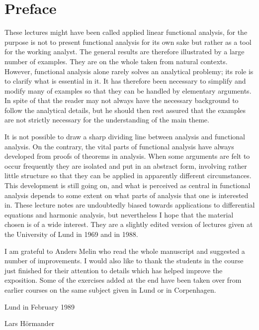 \indentafterchapter
\chapter*{Preface}
These lectures might have been called applied linear functional
analysis, for the purpose is not to present functional analysis for
its own sake but rather as a tool for the working analyst. The general
results are therefore illustrated by a large number of examples. They
are on the whole taken from natural contexts. However, functional
analysis alone rarely solves an analytical problemy; its role is to
clarify what is essential in it. It has therefore been necessary to
simplify and modify many of examples so that they can be handled by
elementary arguments. In spite of that the reader may not always have
the necessary background to follow the analytical details, but he
should then rest assured that the examples are not strictly necessary
for the understanding of the main theme.\par
It is not possible to draw a sharp dividing line between analysis and
functional analysis. On the contrary, the vital parts of functional
analysis have always developed from proofs of theorems in
analysis. When some arguments are felt to occur frequently they are
isolated and put in an abstract form, involving rather little
structure so that they can be applied in apparently different
circumstances. This development is still going on, and what is
perceived as central in functional analysis depends to some extent on
what parts of analysis that one is interested in. These lecture notes
are undoubtedly biased towards applications to differential equations
and harmonic analysis, but nevertheless I hope that the material
chosen is of a wide interest. They are a slightly edited version of
lectures given at the University of Lund in 1969 and in 1988.\par
I am grateful to Anders Melin who read the whole manuscript and
suggested a number of improvements. I would also like to thank the
students in the course just finished for their attention to details
which has helped improve the exposition. Some of the exercises added
at the end have been taken over from earlier courses on the same
subject given in Lund or in Corpenhagen.
\vspace*{3em}
\begin{flushright}
  \parbox{5cm}{Lund in February 1989\\\rule{0pt}{5em}Lars
    H\"ormander\hfill}
\end{flushright}

